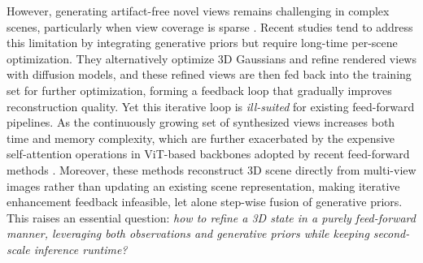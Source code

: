 


However, generating artifact-free novel views remains challenging in complex scenes, particularly when view coverage is sparse \cite{kerbl20233d}. Recent studies \cite{wu2025difix3d+,wu2025genfusion} tend to address this limitation by integrating generative priors but require long-time per-scene optimization.
They alternatively optimize 3D Gaussians and refine rendered views with diffusion models, and these refined views are then fed back into the training set for further optimization, forming a feedback loop that gradually improves reconstruction quality. 
Yet this iterative loop is \emph{ill-suited} for existing feed-forward pipelines. As the continuously growing set of synthesized views increases both time and memory complexity, which are further exacerbated by the expensive self-attention operations in ViT-based backbones \cite{sharir2021image} adopted by recent feed-forward methods \cite{charatan2024pixelsplat, chen2024mvsplat, xu2025depthsplat, ye2024no, jiang2025anysplat}. Moreover, these methods reconstruct 3D scene directly from multi-view images rather than updating an existing scene representation, making iterative enhancement feedback infeasible, let alone step-wise fusion of generative priors. This raises an essential question: \emph{how to refine a 3D state in a purely feed-forward manner, leveraging both observations and generative priors while keeping second-scale inference runtime?}

